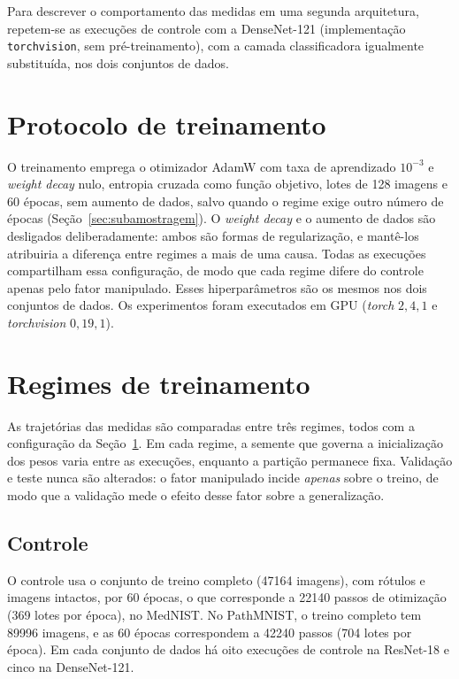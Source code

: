 Para descrever o comportamento das medidas em uma segunda arquitetura,
repetem-se as execuções de controle com a DenseNet-121 (implementação
\texttt{torchvision}, sem pré-treinamento), com a camada classificadora
igualmente substituída, nos dois conjuntos de dados.

\section{Protocolo de treinamento}
\label{sec:treinamento}

O treinamento emprega o otimizador AdamW com taxa de aprendizado $10^{-3}$ e
\emph{weight decay} nulo, entropia cruzada como função objetivo, lotes de 128
imagens e 60 épocas, sem aumento de dados, salvo quando o regime exige outro
número de épocas (Seção~\ref{sec:subamostragem}). O \emph{weight decay} e o
aumento de dados são desligados deliberadamente: ambos são formas de
regularização, e mantê-los atribuiria a diferença entre regimes a mais de uma
causa. Todas as execuções compartilham essa configuração, de modo que cada
regime difere do controle apenas pelo fator manipulado.
Esses hiperparâmetros são os mesmos nos dois conjuntos de dados.
Os experimentos foram executados em GPU (\emph{torch} $2{,}4{,}1$ e
\emph{torchvision} $0{,}19{,}1$).

\section{Regimes de treinamento}
\label{sec:regimes}

As trajetórias das medidas são comparadas entre três regimes, todos com a
configuração da Seção~\ref{sec:treinamento}. Em cada regime, a semente que
governa a inicialização dos pesos varia entre as execuções, enquanto a partição
permanece fixa. Validação e teste nunca são alterados: o fator manipulado
incide \emph{apenas} sobre o treino, de modo que a validação mede o efeito
desse fator sobre a generalização.

\subsection{Controle}
\label{sec:controle}

O controle usa o conjunto de treino completo (\num{47164} imagens), com rótulos e
imagens intactos, por 60 épocas, o que corresponde a \num{22140} passos de
otimização (369 lotes por época), no MedNIST. No PathMNIST, o treino completo
tem \num{89996} imagens, e as 60 épocas correspondem a \num{42240} passos (704
lotes por época). Em cada conjunto de dados há oito execuções de controle na
ResNet-18 e cinco na DenseNet-121.


